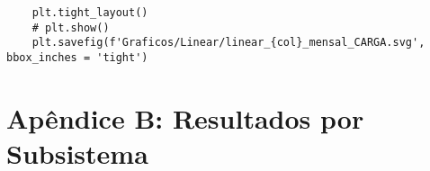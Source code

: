 \begin{apendicesenv}
\begin{verbatim}
    plt.tight_layout()
    # plt.show()
    plt.savefig(f'Graficos/Linear/linear_{col}_mensal_CARGA.svg', bbox_inches = 'tight')

\end{verbatim}

\chapter*{Apêndice B: Resultados por Subsistema}
\lipsum[1-1]

\end{apendicesenv}